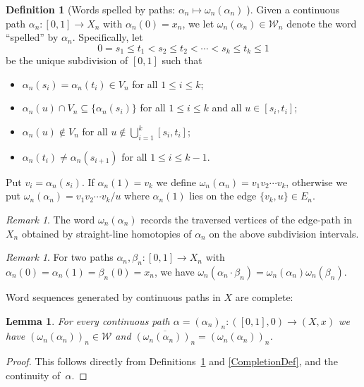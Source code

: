 \documentclass{amsart}
\newtheorem{lemma}[theorem]{Lemma}
\theoremstyle{definition}
\newtheorem{definition}[theorem]{Definition}
\theoremstyle{remark}
\newtheorem{remark}[theorem]{Remark}
\numberwithin{equation}{section}
\begin{document}
\begin{definition}[Words spelled by paths: $\alpha_n\mapsto \omega_n(\alpha_n)\;$] \label{spelling} Given a continuous path \linebreak $\alpha_n:[0,1]\rightarrow X_n$ with $\alpha_n(0)=x_n$, we  let $\omega_n(\alpha_n)\in {\mathcal W}_n$ denote the word ``spelled''  by $\alpha_n$. Specifically, let \[0=s_1\leqslant t_1<s_2\leqslant t_2<\cdots<s_k\leqslant t_k\leqslant1\] be the unique subdivision of $[0,1]$ such that
\begin{itemize}\item[]$\alpha_n(s_i)=\alpha_n(t_i)\in V_n$ for all $1\leqslant i\leqslant k$;\item[] $\alpha_n(u)\cap V_n\subseteq\{\alpha_n(s_i)\}$ for all $1\leqslant i\leqslant k$ and all $u\in [s_i,t_i]$;\item[] $\alpha_n(u)\not\in V_n$ for all $u\not\in \bigcup_{i=1}^k[s_i,t_i]$;  \item[] $\alpha_n(t_i)\not=\alpha_n(s_{i+1})$ for all $1\leqslant i\leqslant k-1$.\end{itemize}
Put $v_i=\alpha_n(s_i)$. If $\alpha_n(1)=v_k$ we define $\omega_n(\alpha_n)=v_1v_2\cdots v_k$, otherwise we put $\omega_n(\alpha_n)=v_1v_2\cdots v_k/u$ where $\alpha_n(1)$ lies on the edge $\{v_k,u\}\in E_n$. \end{definition}

\begin{remark}\label{straight} The word $\omega_n(\alpha_n)$ records the traversed vertices of the edge-path in $X_n$ obtained by straight-line homotopies of $\alpha_n$ on the above subdivision intervals.
\end{remark}

\begin{remark}
  For two paths $\alpha_n,\beta_n:[0,1]\rightarrow X_n$ with $\alpha_n(0)=\alpha_n(1)=\beta_n(0)=x_n$, we have $\omega_n(\alpha_n\cdot \beta_n)=\omega_n(\alpha_n)\omega_n(\beta_n)$.
\end{remark}

Word sequences generated by continuous paths in $X$ are complete:

\begin{lemma}\label{obvious}
For every continuous path  $\alpha=(\alpha_n)_n:([0,1],0)\rightarrow (X,x)$ we have $(\omega_n(\alpha_n))_n\in {\mathcal W}$ and $\overline{(\omega_n(\alpha_n))_n}=(\omega_n(\alpha_n))_n$.
\end{lemma}

\begin{proof}
This follows directly from Definitions~\ref{spelling} and \ref{CompletionDef}, and the continuity of~$\alpha$.
\end{proof}
\end{document}
